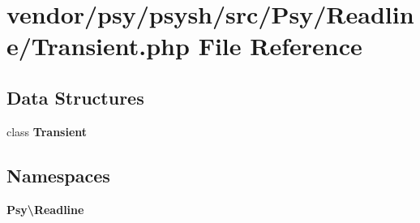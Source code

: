 \section{vendor/psy/psysh/src/\+Psy/\+Readline/\+Transient.php File Reference}
\label{_transient_8php}
\subsection*{Data Structures}
\begin{DoxyCompactItemize}
\item 
class {\bf Transient}
\end{DoxyCompactItemize}
\subsection*{Namespaces}
\begin{DoxyCompactItemize}
\item 
 {\bf Psy\textbackslash{}\+Readline}
\end{DoxyCompactItemize}
